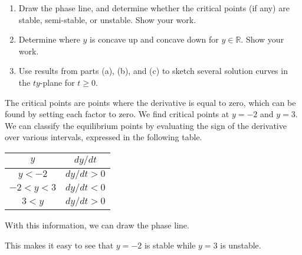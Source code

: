 \documentclass[11pt, titlepage]{article}
\newcommand*{\TickSize}{2pt}%
\newcommand*{\AxisMin}{0}%
\newcommand*{\AxisMax}{0}%
\newcommand*{\DrawHorizontalPhaseLine}[4][]{%
    \gdef\AxisMin{0}%
    \gdef\AxisMax{0}%
    \edef\MyList{#2}%
    \foreach \X in \MyList {
        \draw  (\X,\TickSize) -- (\X,-\TickSize) node [below] {$\X$};
        \ifnum\AxisMin>\X
            \xdef\AxisMin{\X}%
        \fi
        \ifnum\AxisMax<\X
            \xdef\AxisMax{\X}%
        \fi
    }

    \edef\MyList{#3}%
    \foreach \X in \MyList {%
        \draw [->] (\X-0.1,0) -- (\X,0);
        \ifnum\AxisMin>\X
            \xdef\AxisMin{\X}%
        \fi
        \ifnum\AxisMax<\X
            \xdef\AxisMax{\X}%
        \fi
    }

    \edef\MyList{#4}%
    \foreach \X in \MyList {%
        \draw [<-] (\X-0.1,0) -- (\X,0);
        \ifnum\AxisMin>\X
            \xdef\AxisMin{\X}%
        \fi
        \ifnum\AxisMax<\X
            \xdef\AxisMax{\X}%
        \fi
    }

    \draw  (\AxisMin-1,0) -- (\AxisMax+1,0) node [right] {#1};
}
\begin{document}
\begin{enumerate}
\begin{enumerate}[label={(\alph*)}]
            \item Draw the phase line, and determine whether the critical points (if any) are stable, semi-stable, or unstable. Show your work.

            \item Determine where $y$ is concave up and concave down for $y \in \mathbb{R}$. Show your work.

            \item Use results from parts (a), (b), and (c) to sketch several solution curves in the $ty$-plane for $t \geq 0$.
        \end{enumerate}

        \begin{solution}
            The critical points are points where the derivative is equal to zero, which can be found by setting each factor to zero.
            We find critical points at $y = -2$ and $y = 3$.
            We can classify the equilibrium points by evaluating the sign of the derivative over various intervals, expressed in the following table.
            \begin{center}
                \begin{tabular}{ |c|c| }
                    \hline
                    $y$ & $dy / dt$ \\
                    \hline
                    $y < -2$ & $dy / dt > 0$ \\
                    \hline
                    $-2 < y < 3$ & $dy / dt < 0$ \\
                    \hline
                    $3 < y$ & $dy / dt > 0$ \\
                    \hline
                \end{tabular}
            \end{center}
            With this information, we can draw the phase line.

            \begin{figure}[h]
                \centering
            \end{figure}
            This makes it easy to see that $y = -2$ is stable while $y = 3$ is unstable.


\end{solution}
\end{enumerate}
\end{document}
